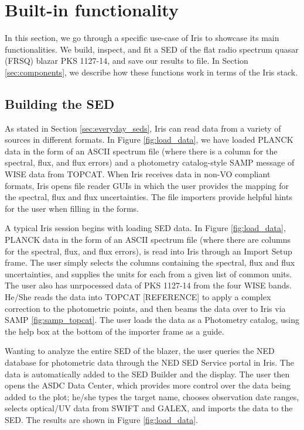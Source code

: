 \section{Built-in functionality}
\label{builtin}

In this section, we go through a specific use-case of Iris to showcase its main functionalities. We build, inspect, and fit a SED of the flat radio spectrum quasar (FRSQ) blazar PKS 1127-14, and save our results to file. In Section \ref{sec:components}, we describe how these functions work in terms of the Iris stack.

\subsection{Building the SED}

As stated in Section \ref{sec:everyday_seds}, Iris can read data from a variety of sources in different formats. In Figure \ref{fig:load_data}, we have loaded PLANCK data in the form of an ASCII spectrum file (where there is a column for the spectral, flux, and flux errors) and a photometry catalog-style SAMP message of WISE data from TOPCAT. When Iris receives data in non-VO compliant formats, Iris opens file reader GUIs in which the user provides the mapping for the spectral, flux and flux uncertainties. The file importers provide helpful hints for the user when filling in the forms.

A typical Iris session begins with loading SED data. In Figure \ref{fig:load_data}, PLANCK data in the form of an ASCII spectrum file (where there are columns for the spectral, flux, and flux errors), is read into Iris through an Import Setup frame. The user simply selects the columns containing the spectral, flux and flux uncertainties, and supplies the units for each from a given list of common units. The user also has unrpocessed data of PKS 1127-14 from the four WISE bands. He/She reads the data into TOPCAT [REFERENCE] to apply a complex correction to the photometric points, and then beams the data over to Iris via SAMP \ref{fig:samp_topcat}. The user loads the data as a Photometry catalog, using the help box at the bottom of the importer frame as a guide. 

Wanting to analyze the entire SED of the blazer, the user queries the NED database for photometric data through the NED SED Service portal in Iris. The data is automatically added to the SED Builder and the display. The user then opens the ASDC Data Center, which provides more control over the data being added to the plot; he/she types the target name, chooses observation date ranges, selects optical/UV data from SWIFT and GALEX, and imports the data to the SED. The results are shown in Figure \ref{fig:load_data}.

